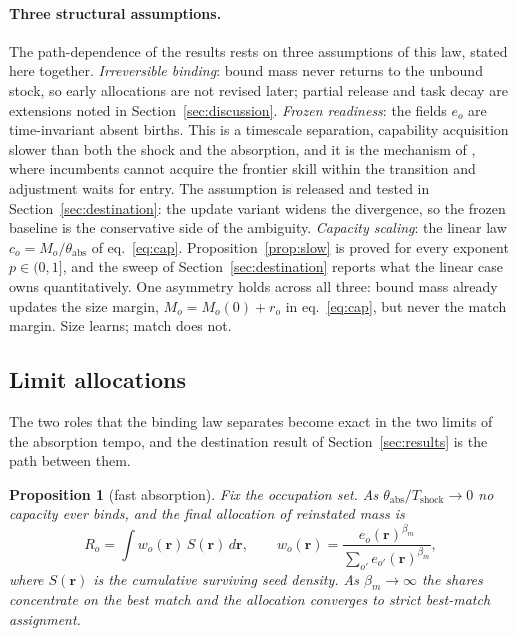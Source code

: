 \documentclass[12pt, a4paper]{article}
\newtheorem{proposition}{Proposition}
\newcommand{\rr}{\mathbf{r}}
\begin{document}
\paragraph{Three structural assumptions.} The path-dependence of the
results rests on three assumptions of this law, stated here together.
\emph{Irreversible binding}: bound mass never returns to the unbound
stock, so early allocations are not revised later; partial release and
task decay are extensions noted in Section~\ref{sec:discussion}.
\emph{Frozen readiness}: the fields $e_o$ are time-invariant absent
births. This is a timescale separation, capability acquisition slower
than both the shock and the absorption, and it is the mechanism of
\textcite{adao2024fast}, where incumbents cannot acquire the frontier
skill within the transition and adjustment waits for entry. The
assumption is released and tested in Section~\ref{sec:destination}: the
update variant widens the divergence, so the frozen baseline is the
conservative side of the ambiguity.
\emph{Capacity scaling}: the linear law $c_o = M_o/\theta_{\text{abs}}$
of eq.~\eqref{eq:cap}. Proposition~\ref{prop:slow} is proved for every
exponent $p \in (0,1]$, and the sweep of Section~\ref{sec:destination}
reports what the linear case owns quantitatively. One asymmetry holds
across all three: bound mass already updates the size margin,
$M_o = M_o(0) + r_o$ in eq.~\eqref{eq:cap}, but never the
match margin. Size learns; match does not.

\subsection{Limit allocations}
\label{sec:limits}

The two roles that the binding law separates become exact in the two
limits of the absorption tempo, and the destination result of
Section~\ref{sec:results} is the path between them.

\begin{proposition}[fast absorption]
\label{prop:fast}
Fix the occupation set. As $\theta_{\text{abs}}/T_{\text{shock}} \to 0$
no capacity ever binds, and the final allocation of reinstated mass is
\begin{equation}
R_o = \int w_o(\rr)\, S(\rr)\, d\rr,
\qquad
w_o(\rr) = \frac{e_o(\rr)^{\beta_m}}{\sum_{o'} e_{o'}(\rr)^{\beta_m}},
\label{eq:fastlimit}
\end{equation}
where $S(\rr)$ is the cumulative surviving seed density. As
$\beta_m \to \infty$ the shares concentrate on the best match and the
allocation converges to strict best-match assignment.
\end{proposition}
\end{document}
